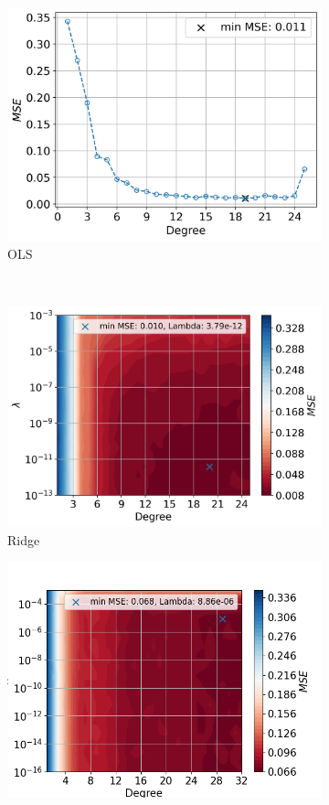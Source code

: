 \documentclass[12pt]{article}
\begin{document}
\begin{figure}
  \begin{subfigure}{\textwidth}
    \centering
    \includegraphics[width=.5\textwidth]{../figures/best_lambda_OLS_00.png}
    \caption{OLS}
    \label{fig:best_ols_real}
  \end{subfigure}\\[1ex]
  \begin{subfigure}{.5\textwidth}
    \centering
    \includegraphics[width=\textwidth]{../figures/best_lambda_RIDGE_00.png}
    \caption{Ridge}
    \label{fig:best_ridge_real}
  \end{subfigure}
  \begin{subfigure}{.5\textwidth}
    \centering
    \includegraphics[width=\textwidth]{../figures/best_lambda_LASSO_1000iter.png}

\end{subfigure}
\end{figure}
\end{document}
